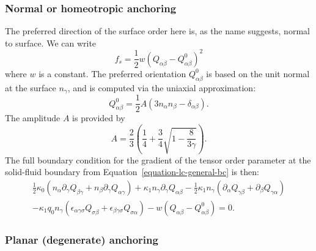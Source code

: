 \subsubsection{Normal or homeotropic anchoring}
The preferred direction of the surface order here is, as the name
suggests, normal to surface. We can write
\begin{equation}
f_s = {\textstyle\frac{1}{2}} w (Q_{\alpha\beta} - Q_{\alpha\beta}^0)^2
\end{equation}
where $w$ is a constant.
The preferred orientation $Q^0_{\alpha\beta}$ is based on the unit normal
at the surface $n_\gamma$, and is computed via the uniaxial approximation:
\begin{equation}
Q^0_{\alpha\beta}
= {\textstyle \frac{1}{2}} A (3n_\alpha n_\beta - \delta_{\alpha\beta}).
\end{equation}
The amplitude $A$ is provided by 
\begin{equation}
\label{equation-lc-amplitude}
A=\frac{2}{3}\left(\frac{1}{4}+\frac{3}{4}\sqrt{1 - \frac{8}{3\gamma}}\right).
\end{equation}
The full boundary condition for the gradient of the tensor order parameter
at the solid-fluid boundary from Equation~\ref{equation-lc-general-bc}
is then:
\begin{eqnarray}
{\textstyle\frac{1}{2}} \kappa_0 (n_\alpha \partial_\gamma Q_{\beta\gamma}
+ n_\beta \partial_\gamma Q_{\alpha\gamma})
+ \kappa_1 n_\gamma \partial_\gamma Q_{\alpha\beta}
- {\textstyle\frac{1}{2}} \kappa_1 n_\gamma ( \partial_\alpha Q_{\gamma\beta}
+ \partial_\beta Q_{\gamma\alpha})
\nonumber
\\
- \kappa_1 q_0 n_\gamma (\epsilon_{\alpha\gamma\sigma} Q_{\sigma\beta}
+ \epsilon_{\beta\gamma\sigma}Q_{\sigma\alpha})
- w(Q_{\alpha\beta} - Q_{\alpha\beta}^0) = 0.
\label{equation-lc-bc-normal}
\end{eqnarray}

\subsubsection{Planar (degenerate) anchoring}

